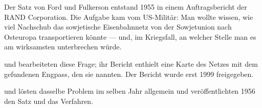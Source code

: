 \begin{geschichte}
Der Satz von Ford und Fulkerson entstand 1955 in einem Auftragsbericht der RAND Corporation. Die Aufgabe kam vom US-Militär: Man wollte wissen, wie viel Nachschub das sowjetische Eisenbahnnetz von der Sowjetunion nach Osteuropa transportieren könnte --- und, im Kriegsfall, an welcher Stelle man es am wirksamsten unterbrechen würde.

 und  bearbeiteten diese Frage; ihr Bericht enthielt eine Karte des Netzes mit dem gefundenen Engpass, den sie  nannten. Der Bericht wurde erst 1999 freigegeben.

 und  lösten dasselbe Problem im selben Jahr allgemein und veröffentlichten 1956 den Satz und das Verfahren.

\begin{center}
\begin{minipage}{0.9\textwidth}
\end{minipage}
\end{center}
\end{geschichte}

